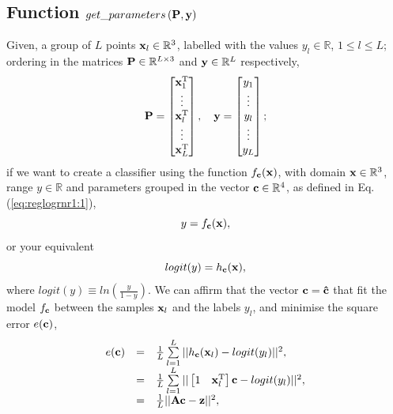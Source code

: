 \subsection{Function $get\_parameters\left( \MATRIX{P}, \VECTOR{y}\right)$}
Given, a group of $L$ points
$\VECTOR{x}_l \in \mathbb{R}^{3}$,
labelled with the values $y_l \in \mathbb{R}$, $1\leq l \leq L$;
ordering in the matrices $\MATRIX{P} \in \mathbb{R}^{L \times 3}$ and 
$\VECTOR{Y} \in \mathbb{R}^{L}$ respectively,
\begin{equation}
\MATRIX{P}=
\begin{bmatrix}
\VECTOR{x}_1^{\transpose}  \\
\vdots  \\
\VECTOR{x}_l^{\transpose}  \\
\vdots \\
\VECTOR{x}_L^{\transpose} \\
\end{bmatrix},
\quad 
\VECTOR{y}=
\begin{bmatrix}
y_1  \\
\vdots  \\
y_l  \\
\vdots \\
y_L \\
\end{bmatrix};
\end{equation}
if we want to create a classifier using the function $f_{\VECTOR{c}}(\VECTOR{x})$,
with domain $\VECTOR{x} \in \mathbb{R}^{3}$, range $y \in \mathbb{R}$ and
parameters grouped in the vector $\VECTOR{c}\in \mathbb{R}^{4}$,
as defined in Eq. (\ref{eq:reglogrnr1:1}),
\begin{equation}\label{eq:reglogrnr1:1}
y=f_{\VECTOR{c}}(\VECTOR{x}),
\end{equation}
or your equivalent
\begin{equation}\label{eq:logitfunc}
logit(y)=h_{\VECTOR{c}}(\VECTOR{x}),
\end{equation}
where $logit(y) \equiv ln\left( \frac{y}{1-y}\right)$.
We can affirm that 
the vector $\VECTOR{c}= \VECTOR{\hat{c}}$
that fit the model $f_{\VECTOR{c}}$ between the samples $\VECTOR{x}_l$ and the labels $y_l$,
and minimise the square error $e(\VECTOR{c})$,
\begin{equation}\label{eq:reglogrnr1:1e}
\begin{array}{lll}
e(\VECTOR{c}) & = & \frac{1}{L}\sum\limits_{l=1}^{L} ||h_{\VECTOR{c}}(\VECTOR{x}_l)-logit(y_l)||^2,\\
            ~ & = & \frac{1}{L}\sum\limits_{l=1}^{L} ||\left[1\quad \VECTOR{x}_l^{\transpose}\right]\VECTOR{c}-logit(y_l)||^2,\\
            ~ & = & \frac{1}{L}||\MATRIX{A}\VECTOR{c}-\VECTOR{z}||^2,
\end{array}
\end{equation}
